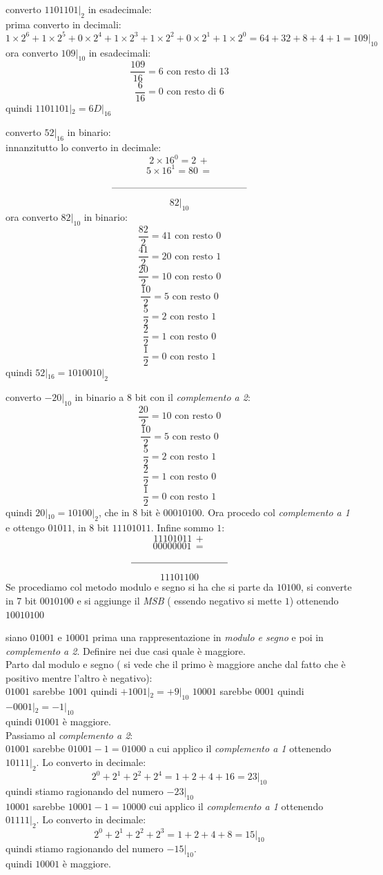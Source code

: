 \documentclass[a4paper,12pt, oneside]{book}
\begin{document}
\begin{esercizio}
	converto $1101101|_2$ in esadecimale:\\
	prima converto in decimali:
	$$1\times 2^6+ 1\times 2^5+ 0\times 2^4 +1 \times 2^3+ 1\times 2^2 +0\times 2^1+1\times 2^0=64+32+8+4+1=109|_{10}$$
	ora converto $109|_{10}$ in esadecimali:
	$$\frac{109}{16}=6 \mbox{ con resto di } 13$$
	$$\frac{6}{16}=0 \mbox{ con resto di } 6$$
	quindi $1101101|_2=6D|_{16}$
\end{esercizio}
\begin{esercizio}
	converto $52|_{16}$ in binario:\\
	innanzitutto lo converto in decimale:
	$$2\times 16^0=2\,+$$
	$$5\times 16^1= 80\,=$$
	$$\rule{140pt}{.4pt}$$
	$$82|_{10}$$
	ora converto $82|_{10}$ in binario:
	$$\frac{82}{2}=41 \mbox{ con resto } 0$$
	$$\frac{41}{2}=20 \mbox{ con resto } 1$$
	$$\frac{20}{2}=10 \mbox{ con resto } 0$$
	$$\frac{10}{2}=5 \mbox{ con resto } 0$$
	$$\frac{5}{2}=2 \mbox{ con resto } 1$$
	$$\frac{2}{2}=1 \mbox{ con resto } 0$$
	$$\frac{1}{2}=0 \mbox{ con resto } 1$$
	quindi $52|_{16}=1010010|_2$
\end{esercizio}
\begin{esercizio}
	converto $-20|_{10}$ in binario a 8 bit con il \textit{complemento a 2}:
	$$\frac{20}{2}=10 \mbox{ con resto } 0$$
	$$\frac{10}{2}=5 \mbox{ con resto } 0$$
	$$\frac{5}{2}=2 \mbox{ con resto } 1$$
	$$\frac{2}{2}=1 \mbox{ con resto } 0$$
	$$\frac{1}{2}=0 \mbox{ con resto } 1$$
	quindi $20|_{10}=10100|_2$, che in 8 bit è $00010100$. Ora procedo col \textit{complemento a 1} e ottengo $01011$, in 8 bit $11101011$. Infine sommo $1$:
	$$11101011\,+$$
	$$00000001\,=$$
	$$\rule{100pt}{.4pt}$$
	$$11101100$$
	Se procediamo col metodo modulo e segno si ha che si parte da $10100$, si converte in 7 bit $0010100$ e si aggiunge il \textit{MSB} ( essendo negativo si mette $1$) ottenendo $10010100$
\end{esercizio}
\begin{esercizio}[???]
	siano $01001$ e $10001$ prima una rappresentazione in \textit{modulo e segno} e poi in \textit{complemento a 2}. Definire nei due casi quale è maggiore.\\
	Parto dal modulo e segno ( si vede che il primo è maggiore anche dal fatto che è positivo mentre l'altro è negativo):\\
	$01001$ sarebbe $1001$ quindi $+1001|_2=+9|_{10}$
	$10001$ sarebbe $0001$ quindi $-0001|_2=-1|_{10}$\\
	quindi $01001$ è maggiore.\\
	Passiamo al \textit{complemento a 2}:\\
	$01001$ sarebbe $01001-1=01000$ a cui applico il \textit{complemento a 1} ottenendo $10111|_2$. Lo converto in decimale:\\
	$$2^0+2^1+2^2+2^4=1+2+4+16=23|_{10}$$ quindi stiamo ragionando del numero $-23|_{10}$\\
	$10001$ sarebbe $10001-1=10000$  cui applico il \textit{complemento a 1} ottenendo $01111|_2$. Lo converto in decimale:\\
	$$2^0+2^1+2^2+2^3=1+2+4+8=15|_{10}$$ quindi stiamo ragionando del numero $-15|_{10}$.\\quindi $10001$ è maggiore.
\end{esercizio}
\end{document}
